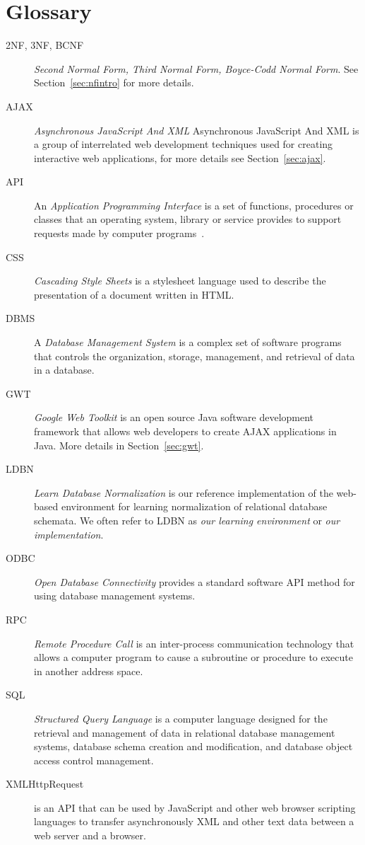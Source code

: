 \section{Glossary}
\begin{description}
	\item[2NF, 3NF, BCNF] \emph{Second Normal Form, Third Normal Form, Boyce-Codd Normal Form}. See Section~\ref{sec:nfintro} for more details.
	\item[AJAX] \emph{Asynchronous JavaScript And XML} Asynchronous JavaScript And XML is a group of interrelated web development techniques used for creating interactive web applications, for more details see Section~\ref{sec:ajax}.
	\item[API] An \emph{Application Programming Interface} is a set of functions, procedures or classes that an operating system, library or service provides to support requests made by computer programs~\cite{wapi}.
	\item[CSS] \emph{Cascading Style Sheets} is a stylesheet language used to describe the presentation of a document written in HTML.
	\item[DBMS] A \emph{Database Management System} is a complex set of software programs that controls the organization, storage, management, and retrieval of data in a database.
	\item[GWT] \emph{Google Web Toolkit} is an open source Java software development framework that allows web developers to create AJAX applications in Java. More details in Section~\ref{sec:gwt}.
	\item[LDBN] \emph{Learn Database Normalization} is our reference implementation of the web-based environment for
    learning normalization of relational database schemata. We often refer to LDBN as \emph{our learning environment} or \emph{our implementation}.
	\item[ODBC] \emph{Open Database Connectivity} provides a standard software API method for using database management systems.
	\item[RPC] \emph{Remote Procedure Call} is an inter-process communication technology that allows a computer program to cause a subroutine or procedure to execute in another address space.
	\item[SQL] \emph{Structured Query Language} is a computer language designed for the retrieval and management of data in relational database management systems, database schema creation and modification, and database object access control management.
	\item[XMLHttpRequest] is an API that can be used by JavaScript and other web browser scripting languages to transfer asynchronously XML and other text data between a web server and a browser.
\end{description}
